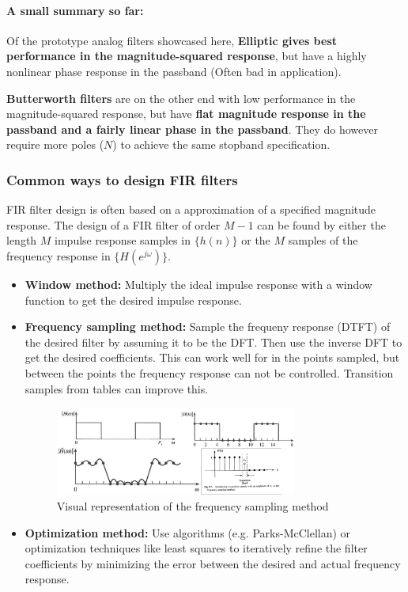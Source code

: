 \documentclass{article}
\begin{document}
\paragraph{A small summary so far:}
Of the prototype analog filters showcased here, \textbf{Elliptic gives best performance in the magnitude-squared response}, but have a highly nonlinear phase response in the passband (Often bad in application). 

\textbf{Butterworth filters} are on the other end with low performance in the magnitude-squared response, but have \textbf{flat magnitude response in the passband and a fairly linear phase in the passband}. They do however require more poles ($N$) to achieve the same stopband specification.


\subsubsection{Common ways to design FIR filters}
FIR filter design is often based on a approximation of a specified magnitude response. The design of a FIR filter of order $M-1$ can be found by either the length $M$ impulse response samples in $\{ h(n) \}$ or the $M$ samples of the frequency response in $\{ H(e^{j\omega}) \}$.
\begin{itemize}
    \item \textbf{Window method:} Multiply the ideal impulse response with a window function to get the desired impulse response.
    \item \textbf{Frequency sampling method:} Sample the frequeny response (DTFT) of the desired filter by assuming it to be the DFT. Then use the inverse DFT to get the desired coefficients. This can work well for in the points sampled, but between the points the frequency response can not be controlled. Transition samples from tables can improve this.
    \begin{figure}[h!]
        \centering
        \includegraphics[width=0.75\textwidth]{figures/Filter design/frequency_sampling_method.png}
        \caption{Visual representation of the frequency sampling method}
        \label{fig:freq_sampling_method}
    \end{figure}
    
    \item \textbf{Optimization method:} Use algorithms (e.g. Parks-McClellan) or optimization techniques like least squares to iteratively refine the filter coefficients by minimizing the error between the desired and actual frequency response.
\end{itemize}
\end{document}
